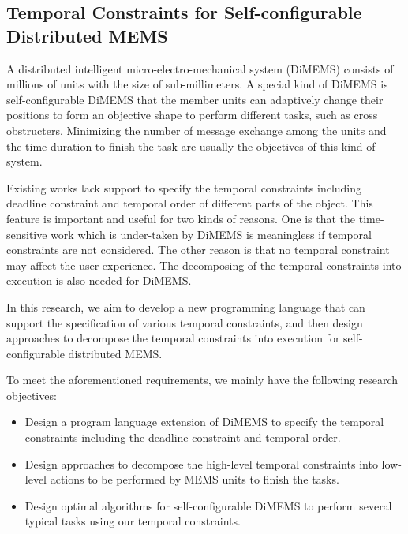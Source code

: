 \subsection{Temporal Constraints for Self-configurable Distributed MEMS}

A distributed intelligent micro-electro-mechanical system (DiMEMS) consists of millions of units with the size of sub-millimeters. A special kind of DiMEMS is self-configurable DiMEMS that the member units can adaptively change their positions to form an objective shape to perform different tasks, such as cross obstructers. Minimizing the number of message exchange among the units and the time duration to finish the task are usually the objectives of this kind of system.

Existing works lack support to specify the temporal constraints including deadline constraint and temporal order of different parts of the object. This feature is important and useful for two kinds of reasons. One is that the time-sensitive work which is under-taken by DiMEMS is meaningless if temporal constraints are not considered. The other reason is that no temporal constraint may affect the user experience. The decomposing of the temporal constraints into execution is also needed for DiMEMS.

In this research, we aim to develop a new programming language that can support the specification of various temporal constraints, and then design approaches to decompose the temporal constraints into execution for self-configurable distributed MEMS.

To meet the aforementioned requirements,  we mainly have the following research objectives:

\begin{itemize}
  \item Design a program language extension of DiMEMS to specify the temporal constraints including the deadline constraint and temporal order.
  \item Design approaches to decompose the high-level temporal constraints into low-level actions to be performed by MEMS units to finish the tasks.
  \item Design optimal algorithms for self-configurable DiMEMS to perform several typical tasks using our temporal constraints.
\end{itemize}


